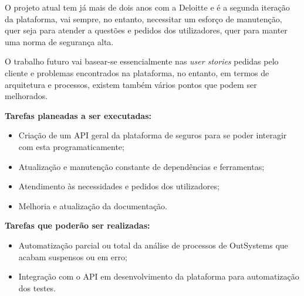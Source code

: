         O projeto atual tem já mais de dois anos com a Deloitte e é a segunda iteração da plataforma, vai sempre, no entanto, necessitar um esforço de manutenção, quer seja para atender a questões e pedidos dos utilizadores, quer para manter uma norma de segurança alta.

        O trabalho futuro vai basear-se essencialmente nas \textit{user stories} pedidas pelo cliente e problemas encontrados na plataforma, no entanto, em termos de arquitetura e processos, existem também vários pontos que podem ser melhorados.

        \textbf{Tarefas planeadas a ser executadas:}
        \begin{itemize}
            \item Criação de um API geral da plataforma de seguros para se poder interagir com esta programaticamente;
            \item Atualização e manutenção constante de dependências e ferramentas;
            \item Atendimento às necessidades e pedidos dos utilizadores;
            \item Melhoria e atualização da documentação.
        \end{itemize}

        \textbf{Tarefas que poderão ser realizadas:}
        \begin{itemize}
            \item Automatização parcial ou total da análise de processos de OutSystems que acabam suspensos ou em erro;
            \item Integração com o API em desenvolvimento da plataforma para automatização dos testes. 
        \end{itemize}

        